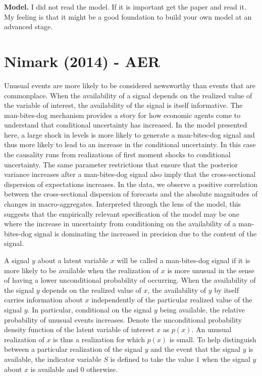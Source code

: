 \documentclass{article}
\begin{document}
{\textbf{Model.} I did not read the model. If it is important get the paper and read it. My feeling is that it might be a good foundation to build your own model at an advanced stage. 

\section*{Nimark (2014) - AER}

Unusual events are more likely to be considered newsworthy than events that are commonplace. When the availability of a signal depends on the realized value of the variable of interest, the availability of the signal is itself informative. The man-bites-dog mechanism provides a story for how economic agents come to understand that conditional uncertainty has increased. In the model presented here, a large shock in levels is more likely to generate a man-bites-dog signal and thus more likely to lead to an increase in the conditional uncertainty. In this case the causality runs from realizations of first moment shocks to conditional uncertainty. The same parameter restrictions that ensure that the posterior variance increases after a man-bites-dog signal also imply that the cross-sectional dispersion of expectations increases. In the data, we observe a positive correlation between the cross-sectional dispersion of forecasts and the absolute magnitudes of changes in macro-aggregates. Interpreted through the lens of the model, this suggests that the empirically relevant specification of the model may be one where the increase in uncertainty from conditioning on the availability of a man-bites-dog signal is dominating the increased in precision due to the content of the signal.

A signal $y$ about a latent variable $x$ will be called a man-bites-dog signal if it is more likely to be available when the realization of $x$ is more unusual in the sense of having a lower unconditional probability of occurring. When the availability of the signal $y$ depends on the realized value of $x$, the availability of $y$ by itself carries information about $x$ independently of the particular realized value of the signal $y$. In particular, conditional on the signal $y$ being available, the relative probability of unusual events increases. Denote the unconditional probability density function of the latent variable of interest $x$ as $p(x)$. An unusual realization of $x$ is thus a realization for which $p(x)$ is small. To help distinguish between a particular realization of the signal $y$ and the event that the signal $y$ is available, the indicator variable $S$ is defined to take the value $1$ when the signal $y$ about $x$ is available and $0$ otherwise. 

}
\end{document}
